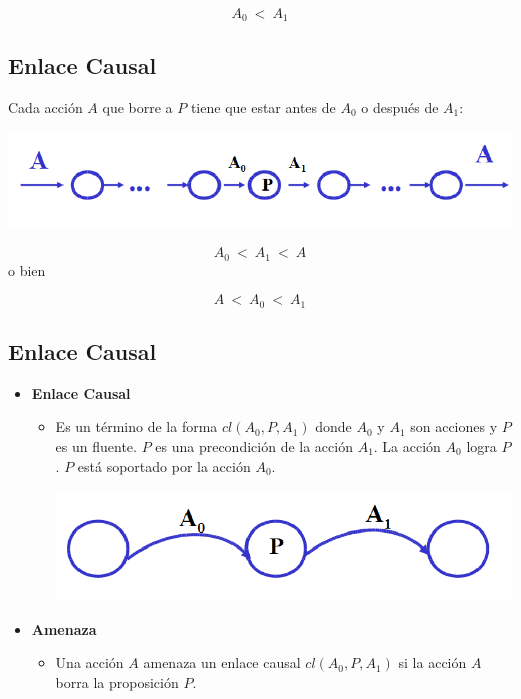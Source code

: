 \documentclass[11pt]{article}
\begin{document}
\[A_0\ <\ A_1\]

\subsection*{Enlace Causal}
\label{sec:org513fecc}

Cada acción \(A\) que borre a \(P\) tiene que estar antes de \(A_0\) o
después de \(A_1\):

\begin{center}
\includegraphics[width=.9\linewidth]{imagenes/EnlaceCausal2.png}
\end{center}

   \[A_0\ <\ A_1\ <\ A\]
o bien 

\[A\ <\ A_0\ <\ A_1\]

\subsection*{Enlace Causal}
\label{sec:org75c2b4f}
\begin{itemize}
\item \textbf{{\color{green}Enlace Causal}}
\begin{itemize}
\item Es un término de la forma {\color{red}\(cl(A_0,P,A_1)\)} donde
\(A_0\) y \(A_1\) son acciones y \(P\) es un fluente. \(P\) es una
precondición de la acción \(A_1\). La acción \(A_0\) logra \(P\). \(P\)
está soportado por la acción \(A_0\).
   \begin{center}
\includegraphics[width=.9\linewidth]{imagenes/EnlaceCausal.png}
\end{center}
\end{itemize}
\item \textbf{{\color{green}Amenaza}}
\begin{itemize}
\item Una acción \(A\) {\color{red}amenaza} un enlace causal \(cl(A_0,P,A_1)\) si la
acción \(A\) borra la proposición \(P\).
\end{itemize}
\end{itemize}
\end{document}
